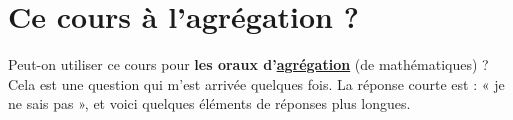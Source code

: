 
\section*{Ce cours à l'agrégation ?}

Peut-on utiliser ce cours pour \textbf{les oraux d'\href{http://agreg.org/}{agrégation}} (de mathématiques) ?  Cela est une question qui m'est arrivée quelques fois.  La réponse courte est : « je ne sais pas », et voici quelques éléments de réponses plus longues.

